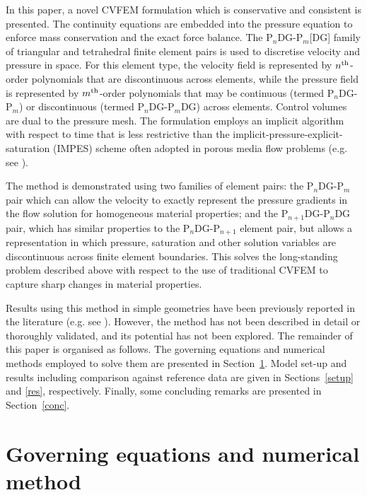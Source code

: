 \documentclass[times]{fldauth}
\newcommand{\PN}[2][error]{P$_{#1}$DG-P$_{#2}$}
\newcommand{\PNDG}[2][error]{P$_{#1}$DG-P$_{#2}$DG}
\begin{document}
In this paper, a novel CVFEM formulation which is conservative and
consistent is presented. The continuity equations are embedded into
the pressure equation to enforce mass conservation and the exact force
balance. The \PN[n]{m}[DG] family of triangular and tetrahedral finite
element pairs is used to discretise velocity and pressure in
space. For this element type, the velocity field is represented by
$n^{\rm th}$-order polynomials that are discontinuous across elements,
while the pressure field is represented by $m^{\rm th}$-order
polynomials that may be continuous (termed P$_n$DG-P$_m$) or
discontinuous (termed P$_n$DG-P$_m$DG) across elements. Control
volumes are dual to the pressure mesh. The formulation employs an
implicit algorithm with respect to time that is less restrictive than
the implicit-pressure-explicit-saturation (IMPES) scheme often adopted
in porous media flow problems (e.g. see \cite{aziz_1986, geiger_2004}).

The method is demonstrated using two families of element pairs: the
\PN[n]{m} pair which can allow the velocity to exactly represent the
pressure gradients in the flow solution for homogeneous material
properties; and the \PNDG[n+1]{n} pair, which has similar properties
to the \PN[n]{n+1} element pair, but allows a representation in which
pressure, saturation and other solution variables are discontinuous
across finite element boundaries. This solves the long-standing
problem described above with respect to the use of traditional CVFEM
to capture sharp changes in material properties.

Results using this method in simple geometries have been previously
reported in the literature
(e.g. see \cite{jackson_2015,kaisu}). However, the method has not
been described in detail or thoroughly validated, and its potential has not been
explored. The remainder of this paper is organised as follows. The
governing equations and numerical methods employed to solve them are
presented in Section~\ref{overlapping_method_section}. Model set-up
and results including comparison against reference data are given in
Sections~\ref{setup} and \ref{res}, respectively. Finally, some
concluding remarks are presented in Section~\ref{conc}.




\section{Governing equations and numerical method}
\label{overlapping_method_section}
\end{document}
